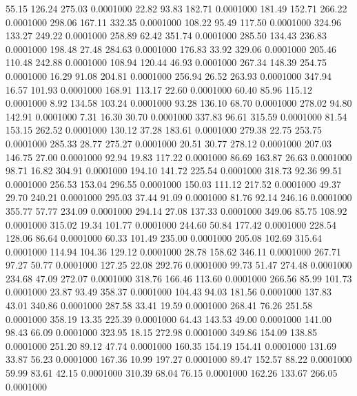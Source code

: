   55.15  126.24  275.03   0.0001000
  22.82   93.83  182.71   0.0001000
 181.49  152.71  266.22   0.0001000
 298.06  167.11  332.35   0.0001000
 108.22   95.49  117.50   0.0001000
 324.96  133.27  249.22   0.0001000
 258.89   62.42  351.74   0.0001000
 285.50  134.43  236.83   0.0001000
 198.48   27.48  284.63   0.0001000
 176.83   33.92  329.06   0.0001000
 205.46  110.48  242.88   0.0001000
 108.94  120.44   46.93   0.0001000
 267.34  148.39  254.75   0.0001000
  16.29   91.08  204.81   0.0001000
 256.94   26.52  263.93   0.0001000
 347.94   16.57  101.93   0.0001000
 168.91  113.17   22.60   0.0001000
  60.40   85.96  115.12   0.0001000
   8.92  134.58  103.24   0.0001000
  93.28  136.10   68.70   0.0001000
 278.02   94.80  142.91   0.0001000
   7.31   16.30   30.70   0.0001000
 337.83   96.61  315.59   0.0001000
  81.54  153.15  262.52   0.0001000
 130.12   37.28  183.61   0.0001000
 279.38   22.75  253.75   0.0001000
 285.33   28.77  275.27   0.0001000
  20.51   30.77  278.12   0.0001000
 207.03  146.75   27.00   0.0001000
  92.94   19.83  117.22   0.0001000
  86.69  163.87   26.63   0.0001000
  98.71   16.82  304.91   0.0001000
 194.10  141.72  225.54   0.0001000
 318.73   92.36   99.51   0.0001000
 256.53  153.04  296.55   0.0001000
 150.03  111.12  217.52   0.0001000
  49.37   29.70  240.21   0.0001000
 295.03   37.44   91.09   0.0001000
  81.76   92.14  246.16   0.0001000
 355.77   57.77  234.09   0.0001000
 294.14   27.08  137.33   0.0001000
 349.06   85.75  108.92   0.0001000
 315.02   19.34  101.77   0.0001000
 244.60   50.84  177.42   0.0001000
 228.54  128.06   86.64   0.0001000
  60.33  101.49  235.00   0.0001000
 205.08  102.69  315.64   0.0001000
 114.94  104.36  129.12   0.0001000
  28.78  158.62  346.11   0.0001000
 267.71   97.27   50.77   0.0001000
 127.25   22.08  292.76   0.0001000
  99.73   51.47  274.48   0.0001000
 234.68   47.09  272.07   0.0001000
 318.76  166.46  113.60   0.0001000
 266.56   85.99  101.73   0.0001000
  23.87   93.49  358.37   0.0001000
 104.43   94.03  181.56   0.0001000
 137.83   43.01  340.86   0.0001000
 287.58   33.41   19.59   0.0001000
 268.41   76.26  251.58   0.0001000
 358.19   13.35  225.39   0.0001000
  64.43  143.53   49.00   0.0001000
 141.00   98.43   66.09   0.0001000
 323.95   18.15  272.98   0.0001000
 349.86  154.09  138.85   0.0001000
 251.20   89.12   47.74   0.0001000
 160.35  154.19  154.41   0.0001000
 131.69   33.87   56.23   0.0001000
 167.36   10.99  197.27   0.0001000
  89.47  152.57   88.22   0.0001000
  59.99   83.61   42.15   0.0001000
 310.39   68.04   76.15   0.0001000
 162.26  133.67  266.05   0.0001000
